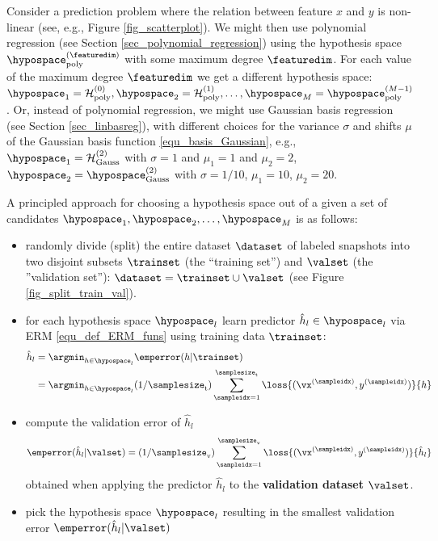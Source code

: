 \documentclass[12pt]{report}
\begin{document}
Consider a prediction problem where the relation between feature $x$ and $y$ is non-linear (see, e.g., Figure \ref{fig_scatterplot}). 
We might then use polynomial regression (see Section \ref{sec_polynomial_regression}) using the hypothesis 
space $\hypospace_{\rm poly}^{(\featuredim)}$ with some maximum degree $\featuredim$. For each value of the 
maximum degree $\featuredim$ we get a different hypothesis space: $\hypospace_{1} = \mathcal{H}_{\rm poly}^{(0)},\hypospace_{2} = \mathcal{H}_{\rm poly}^{(1)},\ldots,\hypospace_{M} = \hypospace_{\rm poly}^{(M-1)}$. 
Or, instead of polynomial regression, we might use Gaussian basis regression (see Section \ref{sec_linbasreg}), 
with different choices for the variance $\sigma$ and shifts $\mu$ of the Gaussian basis function \eqref{equ_basis_Gaussian}, 
e.g., $\hypospace_{1} = \mathcal{H}^{(2)}_{\rm Gauss}$ with $\sigma=1$ and $\mu_{1}=1$ and $\mu_{2}=2$, 
$\hypospace_{2} = \hypospace^{(2)}_{\rm Gauss}$ with $\sigma = 1/10$, $\mu_{1}=10$, $\mu_{2}= 20$.

A principled approach for choosing a hypothesis space out of a given 
a set of candidates $\hypospace_{1},\hypospace_{2},\ldots,\hypospace_{M}$ is as follows: 
\begin{itemize} 
\item randomly divide (split) the entire dataset $\dataset$ of labeled snapshots into two disjoint subsets 
$\trainset$ (the ``training set'') and $\valset$ (the ''validation set''): 
$\dataset = \trainset \cup \valset$ (see Figure \ref{fig_split_train_val}). 
\item for each hypothesis space $\hypospace_{l}$ learn predictor $\hat{h}_{l} \in \hypospace_{l}$ via ERM \eqref{equ_def_ERM_funs} using training data $\trainset$:
\begin{align} 
\label{equ_def_hat_h_fitting_sel}
\hat{h}_{l} & = \argmin_{h \in \hypospace_{l}} \emperror(h| \trainset) \nonumber \\
& = \argmin_{h \in \hypospace_{l}}  (1/\samplesize_{\rm t}) \sum_{\sampleidx=1}^{\samplesize_{\rm t}} \loss{(\vx^{(\sampleidx)},y^{(\sampleidx)})}{h} %
\end{align} 
\item compute the validation error of $\hat{h}_{l}$ 
\begin{equation} 
\label{equ_def_training_val_val_modsel}
\emperror(\hat{h}_{l}|\valset) = (1/\samplesize_{\rm v}) \sum_{\sampleidx=1}^{\samplesize_{\rm v}} \loss{(\vx^{(\sampleidx)},y^{(\sampleidx)})} {\hat{h}_{l}}  %
\end{equation}  
obtained when applying the predictor $\hat{h}_{l}$ to the {\bf validation dataset} $\valset$. 
\item pick the hypothesis space $\hypospace_{l}$ resulting in the smallest validation error $\emperror(\hat{h}_{l}|\valset)$
\end{itemize} 
\end{document}
